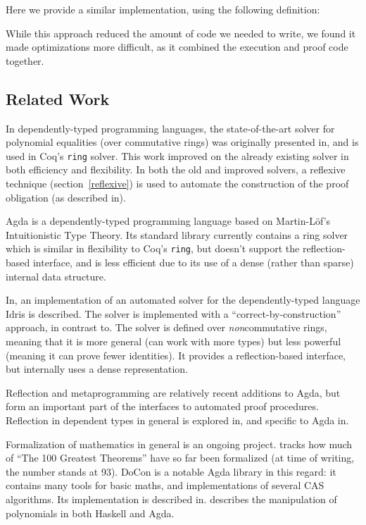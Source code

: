 \documentclass[draft, twocolumn]{article}
\theoremstyle{definition}
\theoremstyle{definition}
\begin{document}
Here we provide a similar implementation, using the following definition:

While this approach reduced the amount of code we needed to write, we found it
made optimizations more difficult, as it combined the execution and proof code
together.
\subsection{Related Work}
In dependently-typed programming languages, the state-of-the-art solver for
polynomial equalities (over commutative rings) was originally presented
in\cite{gregoire_proving_2005}, and is used in Coq's \verb+ring+ solver. This
work improved on the already existing solver\cite{Coq:manual} in both efficiency
and flexibility. In both the old and improved solvers, a reflexive technique
(section~\ref{reflexive}) is used to automate the construction of the proof
obligation (as described in\cite{boutin_using_1997}).

Agda\cite{norell_dependently_2008} is a dependently-typed programming language
based on Martin-Löf's Intuitionistic Type
Theory\cite{martin-lof_intuitionistic_1980}. Its standard
library\cite{danielsson_agda_2018} currently contains a ring solver which is
similar in flexibility to Coq's \verb+ring+, but doesn't support the
reflection-based interface, and is less efficient due to its use of a dense
(rather than sparse) internal data structure.

In\cite{geuvers_automatically_2017}, an implementation of an automated solver
for the dependently-typed language Idris\cite{brady_idris_2013} is described.
The solver is implemented with a ``correct-by-construction'' approach, in
contrast to\cite{gregoire_proving_2005}. The solver is defined over
\emph{non}commutative rings, meaning that it is more general (can work with more
types) but less powerful (meaning it can prove fewer identities). It provides a
reflection-based interface, but internally uses a dense representation.

Reflection and metaprogramming are relatively recent additions to Agda, but form
an important part of the interfaces to automated proof procedures. Reflection in
dependent types in general is explored in\cite{christiansen_practical_2015}, and
specific to Agda in\cite{van_der_walt_reflection_2012}.

Formalization of mathematics in general is an ongoing project.
\cite{wiedijk_formalizing_2018} tracks how much of ``The 100 Greatest Theorems''
\cite{kahl_hundred_2004} have so far been formalized (at time of writing, the
number stands at 93). DoCon\cite{meshveliani_docon-provable_2018} is a notable
Agda library in this regard: it contains many tools for basic maths, and
implementations of several CAS algorithms. Its implementation is described
in\cite{meshveliani_dependent_2013}. \cite{cheng_functional_2018} describes the
manipulation of polynomials in both Haskell and Agda.
\end{document}
